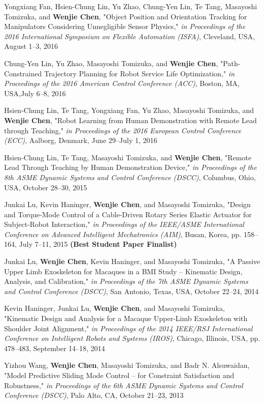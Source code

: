 \documentclass[UTF8,nofonts]{res}
\begin{document}
\begin{resume}
\begin{etaremune}[start=26]
    \item Yongxiang Fan, Hsien-Chung Lin, Yu Zhao, Chung-Yen Lin, Te Tang, Masayoshi Tomizuka, and \textbf{Wenjie Chen}, "Object Position and Orientation Tracking for Manipulators Considering Unnegligible Sensor Physics," \emph{in Proceedings of the 2016 International Symposium on Flexible Automation (ISFA)}, Cleveland, USA, August 1--3, 2016
    \item Chung-Yen Lin, Yu Zhao, Masayoshi Tomizuka, and \textbf{Wenjie Chen}, "Path-Constrained Trajectory Planning for Robot Service Life Optimization," \emph{in Proceedings of the 2016 American Control Conference (ACC)}, Boston, MA, USA,July 6--8, 2016
    \item Hsien-Chung Lin, Te Tang, Yongxiang Fan, Yu Zhao, Masayoshi Tomizuka, and \textbf{Wenjie Chen}, "Robot Learning from Human Demonstration with Remote Lead through Teaching," \emph{in Proceedings of the 2016 European Control Conference (ECC)}, Aalborg, Denmark, June 29--July 1, 2016
    \item Hsien-Chung Lin, Te Tang, Masayoshi Tomizuka, and \textbf{Wenjie Chen}, "Remote Lead Through Teaching by Human Demonstration Device," \emph{in Proceedings of the 8th ASME Dynamic Systems and Control Conference (DSCC)}, Columbus, Ohio, USA, October 28--30, 2015
    \item Junkai Lu, Kevin Haninger, \textbf{Wenjie Chen}, and Masayoshi Tomizuka, "Design and Torque-Mode Control of a Cable-Driven Rotary Series Elastic Actuator for Subject-Robot Interaction," \emph{in Proceedings of the IEEE/ASME International Conference on Advanced Intelligent Mechatronics (AIM)}, Busan, Korea, pp. 158--164, July 7--11, 2015 \textbf{(Best Student Paper Finalist)} 
    \item Junkai Lu, \textbf{Wenjie Chen}, Kevin Haninger, and Masayoshi Tomizuka, "A Passive Upper Limb Exoskeleton for Macaques in a BMI Study -- Kinematic Design, Analysis, and Calibration," \emph{in Proceedings of the 7th ASME Dynamic Systems and Control Conference (DSCC)}, San Antonio, Texas, USA, October 22--24, 2014
    \item Kevin Haninger, Junkai Lu, \textbf{Wenjie Chen}, and Masayoshi Tomizuka, "Kinematic Design and Analysis for a Macaque Upper-Limb Exoskeleton with Shoulder Joint Alignment," \emph{in Proceedings of the 2014 IEEE/RSJ International Conference on Intelligent Robots and Systems (IROS)}, Chicago, Illinois, USA, pp. 478--483, September 14--18, 2014
    \item Yizhou Wang, \textbf{Wenjie Chen}, Masayoshi Tomizuka, and Badr N. Alsuwaidan, "Model Predictive Sliding Mode Control -- for Constraint Satisfaction and Robustness," \emph{in Proceedings of the 6th ASME Dynamic Systems and Control Conference (DSCC)}, Palo Alto, CA, October 21--23, 2013

\end{etaremune}
\end{resume}
\end{document}
